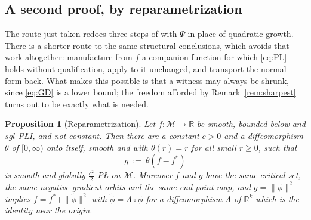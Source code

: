 \documentclass[11pt]{article}
\theoremstyle{plain}
\newtheorem{prop}[thm]{Proposition}
\theoremstyle{definition}
\theoremstyle{remark}
\newcommand{\M}{\mathcal{M}}
\newcommand{\R}{\mathbb{R}}
\begin{document}
\subsection{A second proof, by reparametrization}
\label{sec:shortcut}

The route just taken redoes three steps of \cite{BCR2026} with $\Psi$ in place of
quadratic growth. There is a shorter route to the same structural conclusions,
which avoids that work altogether: manufacture from $f$ a companion function for
which \eqref{eq:PL} holds without qualification, apply \cite{BCR2026} to it
unchanged, and
transport the normal form back. What makes this possible is that a witness may
always be shrunk, since \eqref{eq:GD} is a lower bound; the freedom
afforded by 
Remark~\ref{rem:sharpest} turns out to be exactly what is needed.

\begin{prop}[Reparametrization]\label{prop:shortcut}
Let $f\colon\M\to\R$ be smooth, bounded below and $sgl$-P\L{}I, and not constant.
Then there are a constant $c>0$ and a diffeomorphism $\theta$ of $[0,\infty)$ onto
itself, smooth and with $\theta(r)=r$ for all small $r\ge0$, such that
\[
  g \ :=\ \theta(f-f^*)
\]
is smooth and globally $\tfrac{c^2}{2}$-P\L{} on $\M$. Moreover $f$ and $g$ have
the same critical set, the same negative gradient orbits and the same end-point
map, and $g=\|\phi\|^2$ implies $f = f^*+\|\tilde\phi\|^2$ with
$\tilde\phi=\Lambda\circ\phi$ for a diffeomorphism $\Lambda$ of $\R^k$ which is the
identity near the origin.
\end{prop}
\end{document}
